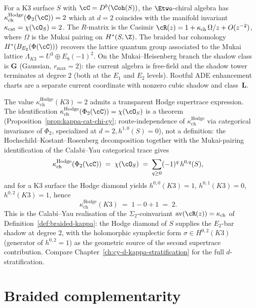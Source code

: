\begin{example}
\label{ex:braided-k3}
For a K3 surface $S$ with $\cC = D^b(\Coh(S))$, the
$\Etwo$-chiral algebra has $\kappa_{\mathrm{ch}}^{\mathrm{Hodge}}(\Phi_2(\cC)) = 2$
which at $d = 2$ coincides with the manifold invariant
$\kappa_{\mathrm{cat}} = \chi(\cO_S) = 2$. The
$R$-matrix is the Casimir
$\cR(z) = 1 + \kappa_{\mathrm{ch}}\,\Omega/z + O(z^{-2})$,
where $\Omega$ is the Mukai pairing on $H^*(S, \Z)$. The braided
bar cohomology $H^*(B_{E_2}(\Phi(\cC)))$ recovers the lattice
quantum group associated to the Mukai lattice
$\Lambda_{K3} = U^3 \oplus E_8(-1)^2$.
On the Mukai--Heisenberg branch the shadow class is $\mathbf{G}$
(Gaussian, $r_{\max} = 2$): the current algebra is free-field and the
shadow tower terminates at degree $2$ (both at the $E_1$ and $E_2$
levels). Rootful ADE enhancement charts are a separate current
coordinate with nonzero cubic shadow and class~$\mathbf{L}$.

The value $\kappa_{\mathrm{ch}}^{\mathrm{Hodge}}(K3) = 2$ admits a transparent
Hodge supertrace expression. The identification
$\kappa_{\mathrm{ch}}^{\mathrm{Hodge}}(\Phi_2(\cC)) = \chi(\cO_S)$ is a theorem
(Proposition~\ref{prop:kappa-cat-chi-cy}; route-independence of
$\kappa_{\mathrm{ch}}^{\mathrm{Hodge}}$ via categorical invariance of $\Phi_2$,
specialized at $d = 2, h^{1,0}(S) = 0$), not a definition: the
Hochschild--Kostant--Rosenberg decomposition together with the
Mukai-pairing identification of the Calabi--Yau categorical trace
gives
\[
 \kappa_{\mathrm{ch}}^{\mathrm{Hodge}}(\Phi_2(\cC))
 \;=\; \chi(\cO_S)
 \;=\; \sum_{q \ge 0} (-1)^q \, h^{0,q}(S),
\]
and for a K3 surface the Hodge diamond yields
$h^{0,0}(K3) = 1$, $h^{0,1}(K3) = 0$, $h^{0,2}(K3) = 1$, hence
\[
 \kappa_{\mathrm{ch}}^{\mathrm{Hodge}}(K3)
 \;=\; 1 - 0 + 1
 \;=\; 2.
\]
This is the Calabi--Yau realisation of the $\Sigma_2$-coinvariant
$\mathrm{av}(\cR(z)) = \kappa_{\mathrm{ch}}$ of
Definition~\ref{def:braided-kappa}: the Hodge diamond of $S$ supplies
the $E_2$-bar shadow at degree $2$, with the holomorphic symplectic
form $\sigma \in H^{0,2}(K3)$ (generator of $h^{0,2} = 1$) as the
geometric source of the second supertrace contribution. Compare
Chapter~\ref{ch:cy-d-kappa-stratification} for the full
$d$-stratification.
\end{example}


\section{Braided complementarity}
\label{sec:braided-complementarity}

